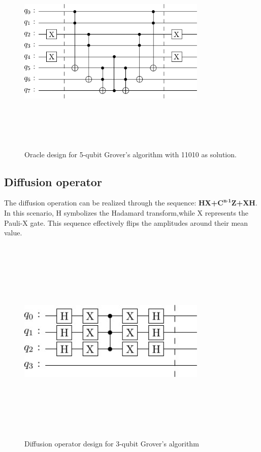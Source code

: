 \documentclass[conference]{IEEEtran}
\begin{document}
\begin{figure}[htbp]
	\centerline{\includegraphics[width=9cm,height=10cm,keepaspectratio]{5-qubit-11010.png}}
	\caption{Oracle design for 5-qubit Grover's algorithm with 11010 as solution.}
	\label{fig:5-qubit}
\end{figure}

\subsection{Diffusion operator}
The diffusion operation can be realized through the sequence: \textbf{HX+$\textbf{C}^{\textbf{n-1}}\textbf{Z}$+XH}. In this scenario, H symbolizes
the Hadamard transform,while X represents the Pauli-X gate.
This sequence effectively flips the amplitudes around their
mean value.

\begin{figure}[htbp]
	\centerline{\includegraphics[width=9cm,height=10cm,keepaspectratio]{3-qubit-diff.png}}
	\caption{Diffusion operator design for 3-qubit Grover’s algorithm}
	\label{3diff}
\end{figure}
\end{document}
